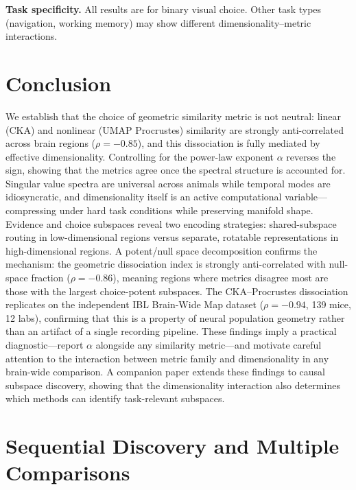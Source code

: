 \documentclass{article}
\begin{document}
\textbf{Task specificity.} All results are for binary visual choice. Other task types (navigation, working memory) may show different dimensionality--metric interactions.

\section{Conclusion}

We establish that the choice of geometric similarity metric is not neutral: linear (CKA) and nonlinear (UMAP Procrustes) similarity are strongly anti-correlated across brain regions ($\rho = -0.85$), and this dissociation is fully mediated by effective dimensionality. Controlling for the power-law exponent $\alpha$ reverses the sign, showing that the metrics agree once the spectral structure is accounted for. Singular value spectra are universal across animals while temporal modes are idiosyncratic, and dimensionality itself is an active computational variable---compressing under hard task conditions while preserving manifold shape. Evidence and choice subspaces reveal two encoding strategies: shared-subspace routing in low-dimensional regions versus separate, rotatable representations in high-dimensional regions. A potent/null space decomposition confirms the mechanism: the geometric dissociation index is strongly anti-correlated with null-space fraction ($\rho = -0.86$), meaning regions where metrics disagree most are those with the largest choice-potent subspaces. The CKA--Procrustes dissociation replicates on the independent IBL Brain-Wide Map dataset ($\rho = -0.94$, 139 mice, 12 labs), confirming that this is a property of neural population geometry rather than an artifact of a single recording pipeline. These findings imply a practical diagnostic---report $\alpha$ alongside any similarity metric---and motivate careful attention to the interaction between metric family and dimensionality in any brain-wide comparison. A companion paper extends these findings to causal subspace discovery, showing that the dimensionality interaction also determines which methods can identify task-relevant subspaces.




\appendix
\section{Sequential Discovery and Multiple Comparisons}
\label{app:sequential}
\end{document}
